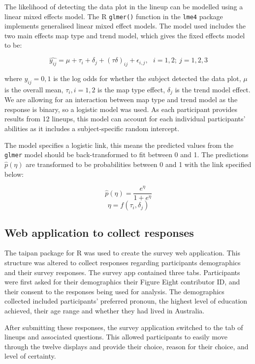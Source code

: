 \documentclass{monashthesis}
\begin{document}
The likelihood of detecting the data plot in the lineup can be modelled using a linear mixed effects model.
The R \autocite{R} \texttt{glmer()} function in the \texttt{lme4} \autocite{lme4} package implements generalised linear mixed effect models. The model used includes the two main effects map type and trend model, which gives the fixed effects model to be:

\[\widehat{y_{ij}} = \mu + \tau_i + \delta_j + (\tau\delta)_{ij} + \epsilon_{i,j}, ~~~ i=1,2; ~j=1,2,3\]

where \(y_{ij} = 0, 1\) is the log odds for whether the subject detected the data plot, \(\mu\) is the overall mean, \(\tau_i, i=1,2\) is the map type effect, \(\delta_j\) is the trend model effect. We are allowing for an interaction between map type and trend model as the response is binary, so a logistic model was used. As each participant provides results from 12 lineups, this model can account for each individual participants' abilities as it includes a subject-specific random intercept.

The model specifies a logistic link, this means the predicted values from the \texttt{glmer} model should be back-transformed to fit between 0 and 1. The predictions \(\widehat{p}(\eta)\) are transformed to be probabilities between 0 and 1 with the link specified below:

\[\widehat{p}(\eta) = \frac{e^{\eta}}{1 + e^{\eta}}\] \label{eq:transform}
\[\eta = f(\tau_i,\delta_j)\]

\hypertarget{web-application-to-collect-responses}{%
\subsection{Web application to collect responses}\label{web-application-to-collect-responses}}

The taipan \autocite{taipan} package for R was used to create the survey web application.
This structure was altered to collect responses regarding participants demographics and their survey responses.
The survey app contained three tabs. Participants were first asked for their demographics their Figure Eight contributor ID, and their consent to the responses being used for analysis. The demographics collected included participants' preferred pronoun, the highest level of education achieved, their age range and whether they had lived in Australia.

After submitting these responses, the survey application switched to the tab of lineups and associated questions. This allowed participants to easily move through the twelve displays and provide their choice, reason for their choice, and level of certainty.
\end{document}
